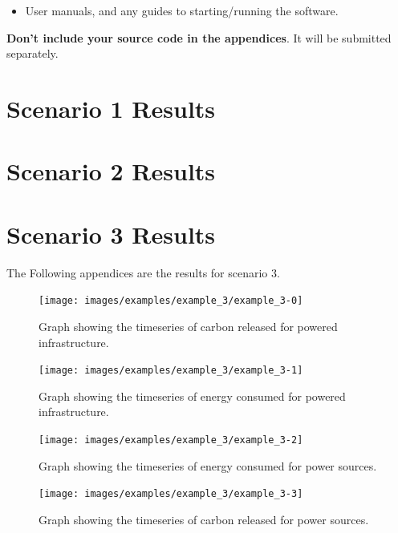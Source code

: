\documentclass{l4proj}
\begin{document}
\begin{appendices}
\begin{itemize}
\item User manuals, and any guides to starting/running the software.

\end{itemize}

\textbf{Don't include your source code in the appendices}. It will be
submitted separately.

\section{Scenario 1 Results}\label{apen:subsec:scen1}
\clearpage
\section{Scenario 2 Results}\label{apen:subsec:scen2}

\clearpage
\section{Scenario 3 Results}\label{apen:subsec:scen3}
The Following appendices are the results for scenario 3.
\clearpage
\begin{figure}[htbp]
    \centering
    \texttt{[image: images/examples/example\_3/example\_3-0]}
    ~
    \caption{Graph showing the timeseries of carbon released for powered infrastructure.}
    \label{fig:example3-0}
\end{figure}
\clearpage
\begin{figure}[htbp]
    \centering
    \texttt{[image: images/examples/example\_3/example\_3-1]}
    ~
    \caption{Graph showing the timeseries of energy consumed for powered infrastructure.}
    \label{fig:example3-1}
\end{figure}
\clearpage
\begin{figure}[htbp]
    \centering
    \texttt{[image: images/examples/example\_3/example\_3-2]}
    ~
    \caption{Graph showing the timeseries of energy consumed for power sources.}
    \label{fig:example3-2}
\end{figure}
\clearpage
\begin{figure}[htbp]
    \centering
    \texttt{[image: images/examples/example\_3/example\_3-3]}
    ~
    \caption{Graph showing the timeseries of carbon released for power sources.}
    \label{fig:example3-3}
\end{figure}

\clearpage

\end{appendices}
\end{document}
